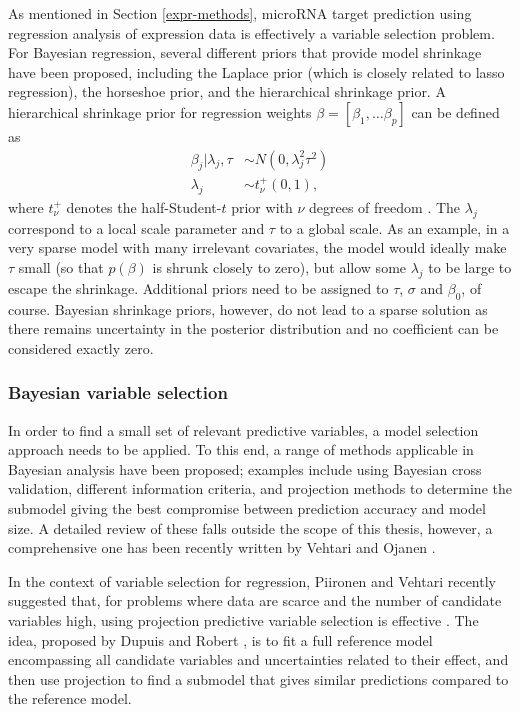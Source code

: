 As mentioned in Section \ref{expr-methods}, microRNA target prediction using
regression analysis of expression data is effectively a variable selection
problem. For Bayesian regression, several different priors that provide model shrinkage
have been proposed, including the Laplace prior (which is closely related to
lasso regression), the horseshoe prior, and the hierarchical shrinkage prior.
A hierarchical shrinkage prior for regression weights
$\beta = [\beta_1, \dotsc \beta_p]$ can be defined as
\begin{subequations}
  \begin{align}
    \beta_j | \lambda_j, \tau & \sim N(0, \lambda_j^2 \tau^2) \\
    \lambda_j                 & \sim t_\nu^+(0,1),
  \end{align}
\end{subequations}
where $t_\nu^+$ denotes the half-Student-$t$ prior with $\nu$ degrees of freedom
\citep{Piironen2015}. The $\lambda_j$ correspond to a local scale parameter and
$\tau$ to a global scale. As an example, in a very sparse model with many irrelevant
covariates, the model would ideally make $\tau$ small (so that $p(\beta)$ is shrunk
closely to zero), but allow some $\lambda_j$ to be large to escape the shrinkage.
Additional priors need to be assigned to $\tau$, $\sigma$ and $\beta_0$, of course.
Bayesian shrinkage priors, however, do not lead to a sparse solution as there remains
uncertainty in the posterior distribution and no coefficient can be considered
exactly zero.


\subsubsection{Bayesian variable selection}

In order to find a small set of relevant predictive variables, a model
selection approach needs to be applied. To this end, a range of methods
applicable in Bayesian analysis have been proposed; examples include using
Bayesian cross validation, different information criteria, and projection
methods to determine the submodel giving the best compromise between
prediction accuracy and model size. A detailed review of these falls outside
the scope of this thesis, however, a comprehensive one has been recently
written by Vehtari and Ojanen
\citep{Vehtari2012}.

In the context of variable selection for regression,
Piironen and Vehtari recently suggested that, for problems where data
are scarce and the number of candidate variables high, using projection predictive
variable selection is effective \citep{Piironen2016}. The idea, proposed by
Dupuis and Robert \citep{Dupuis2003}, is to fit a full reference model
encompassing all candidate variables and uncertainties related to their
effect, and then use projection to find a submodel that gives similar
predictions compared to the reference model.

